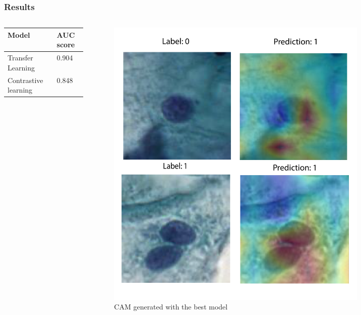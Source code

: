 \documentclass{beamer}
\begin{document}


\begin{frame}
\frametitle{Results}
\begin{columns}
\begin{column}{0.5\textwidth}

\begin{table}[]
\begin{tabular}{ll}
\hline
\textbf{Model} & \textbf{AUC score} \\ \hline
Transfer Learning & 0.904 \\
Contrastive learning & 0.848 \\ \hline
\end{tabular}
\end{table}

\end{column}
\begin{column}{0.5\textwidth}  %
\begin{center}
    \begin{figure}
    \includegraphics[width=0.8\textwidth]{figures/cam.pdf}
    \caption{CAM generated with the best model}
    \end{figure}
\end{center}
\end{column}
\end{columns}
\end{frame}
\end{document}
